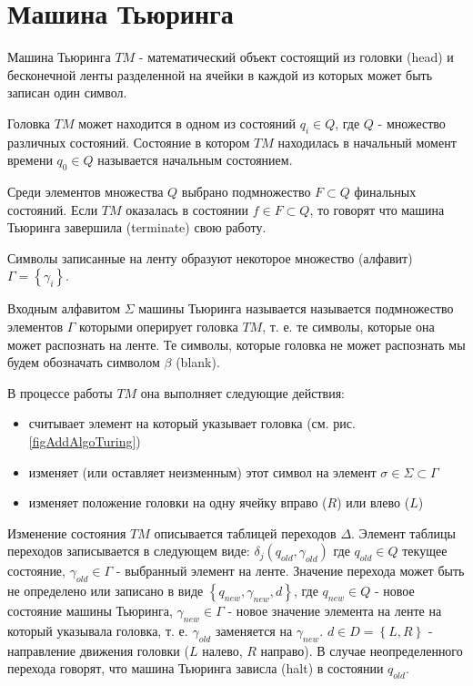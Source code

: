 \section{Машина Тьюринга}
\label{addTuring}

Машина Тьюринга $TM$ - математический объект состоящий из
головки (head) и бесконечной ленты разделенной на ячейки в каждой из
которых может быть записан один символ.



Головка $TM$ может находится в одном из состояний $q_i \in Q$, где $Q$
- множество различных состояний. Состояние в котором $TM$ находилась в
начальный момент времени $q_0 \in Q$ называется начальным состоянием. 

Среди элементов множества $Q$ выбрано подмножество $F \subset Q$
финальных состояний. Если $TM$ оказалась в состоянии $f \in F \subset
Q$, то говорят что машина Тьюринга завершила (terminate) свою работу.

Символы записанные на ленту образуют некоторое множество (алфавит)
$\Gamma = \left\{\gamma_i\right\}$.

Входным алфавитом $\Sigma$ машины Тьюринга называется называется
подмножество элементов $\Gamma$ которыми оперирует головка $TM$,
т. е. те символы, которые она может распознать на ленте. Те символы,
которые головка не может распознать мы будем обозначать символом
$\beta$ (blank).

В процессе работы $TM$ она выполняет следующие действия:
\begin{itemize}
\item{считывает элемент на который указывает головка
  (см. рис. \ref{figAddAlgoTuring})}
\item{изменяет (или оставляет неизменным) этот символ на элемент
  $\sigma \in \Sigma \subset \Gamma$}
\item{изменяет положение головки на одну ячейку вправо ($R$) или влево
($L$)}
\end{itemize}

Изменение состояния $TM$ описывается таблицей переходов
$\Delta$. Элемент таблицы переходов записывается в следующем виде: 
$\delta_j\left(q_{old}, \gamma_{old}\right)$ где $q_{old} \in Q$ текущее состояние,
$\gamma_{old} \in \Gamma$ - выбранный элемент на ленте. Значение
перехода может быть 
не определено или записано в виде $\left\{q_{new}, \gamma_{new}, d\right\}$, где
$q_{new} \in Q$ - новое состояние машины Тьюринга, $\gamma_{new} \in \Gamma$ -
новое значение элемента на ленте на который указывала головка,
т. е. $\gamma_{old}$ заменяется на $\gamma_{new}$. $d \in D =
\left\{L, R\right\}$ - направление
движения головки ($L$ налево, $R$ направо). В случае неопределенного
перехода говорят, что машина Тьюринга зависла (halt) в состоянии $q_{old}$.



